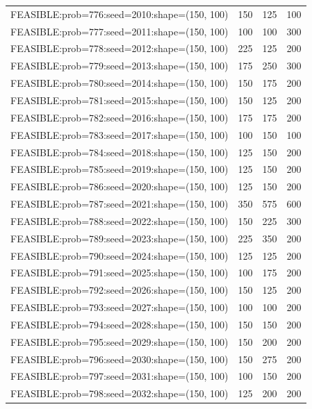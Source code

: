 \begin{longtable}{lccc}
FEASIBLE:prob=776:seed=2010:shape=(150, 100) &      150 &   125 &    100 \\
FEASIBLE:prob=777:seed=2011:shape=(150, 100) &      100 &   100 &    300 \\
FEASIBLE:prob=778:seed=2012:shape=(150, 100) &      225 &   125 &    200 \\
FEASIBLE:prob=779:seed=2013:shape=(150, 100) &      175 &   250 &    300 \\
FEASIBLE:prob=780:seed=2014:shape=(150, 100) &      150 &   175 &    200 \\
FEASIBLE:prob=781:seed=2015:shape=(150, 100) &      150 &   125 &    200 \\
FEASIBLE:prob=782:seed=2016:shape=(150, 100) &      175 &   175 &    200 \\
FEASIBLE:prob=783:seed=2017:shape=(150, 100) &      100 &   150 &    100 \\
FEASIBLE:prob=784:seed=2018:shape=(150, 100) &      125 &   150 &    200 \\
FEASIBLE:prob=785:seed=2019:shape=(150, 100) &      125 &   150 &    200 \\
FEASIBLE:prob=786:seed=2020:shape=(150, 100) &      125 &   150 &    200 \\
FEASIBLE:prob=787:seed=2021:shape=(150, 100) &      350 &   575 &    600 \\
FEASIBLE:prob=788:seed=2022:shape=(150, 100) &      150 &   225 &    300 \\
FEASIBLE:prob=789:seed=2023:shape=(150, 100) &      225 &   350 &    200 \\
FEASIBLE:prob=790:seed=2024:shape=(150, 100) &      125 &   125 &    200 \\
FEASIBLE:prob=791:seed=2025:shape=(150, 100) &      100 &   175 &    200 \\
FEASIBLE:prob=792:seed=2026:shape=(150, 100) &      150 &   125 &    200 \\
FEASIBLE:prob=793:seed=2027:shape=(150, 100) &      100 &   100 &    200 \\
FEASIBLE:prob=794:seed=2028:shape=(150, 100) &      150 &   150 &    200 \\
FEASIBLE:prob=795:seed=2029:shape=(150, 100) &      150 &   200 &    200 \\
FEASIBLE:prob=796:seed=2030:shape=(150, 100) &      150 &   275 &    200 \\
FEASIBLE:prob=797:seed=2031:shape=(150, 100) &      100 &   150 &    200 \\
FEASIBLE:prob=798:seed=2032:shape=(150, 100) &      125 &   200 &    200 \\

\end{longtable}
